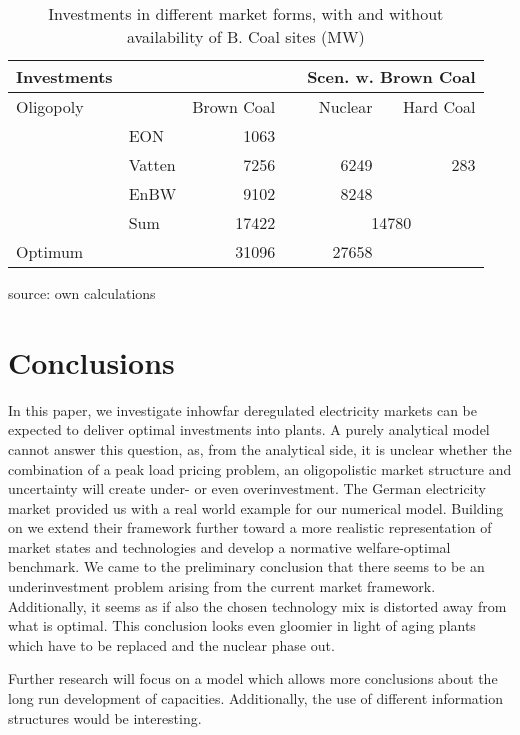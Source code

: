 \begin{table}
\centering
\caption{Investments in different market forms, with and without availability of B. Coal sites (MW)}
\begin{tabular}{llrrrr}
\hline
\hline
Investments &            &            &            & \multicolumn{ 2}{r}{Scen. w. Brown Coal} \\
\hline
 Oligopoly &            & Brown Coal &            &    Nuclear &  Hard Coal \\
\hline
           &        EON &       1063 &            &            &            \\
           &     Vatten &       7256 &            &       6249 &        283 \\
           &       EnBW &       9102 &            &       8248 &            \\
           &        Sum &      17422 &            & \multicolumn{ 2}{c}{14780} \\
\hline
   Optimum &            &      31096 &            &      27658 &            \\
\hline
\hline
\end{tabular}  

\label{tab:invest}
\begin{center}
source: own calculations
\end{center}
\end{table}

\section{Conclusions}

In this paper, we investigate inhowfar deregulated electricity markets can be expected to deliver optimal investments into plants. A purely analytical model cannot answer this question, as, from the analytical side, it is unclear whether the combination of a peak load pricing problem, an oligopolistic market structure and uncertainty will create under- or even overinvestment. The German electricity market provided us with a real world example for our numerical model. Building on \cite{Genc2007} we extend their framework further toward a more realistic representation of market states and technologies and develop a normative welfare-optimal benchmark. We came to the preliminary conclusion that there seems to be an underinvestment problem arising from the current market framework. Additionally, it seems as if also the chosen technology mix is distorted away from what is optimal. This conclusion looks even gloomier in light of aging plants which have to be replaced and the nuclear phase out.

Further research will focus on a model which allows more conclusions about the long run development of capacities. Additionally, the use of different information structures would be interesting.



 
